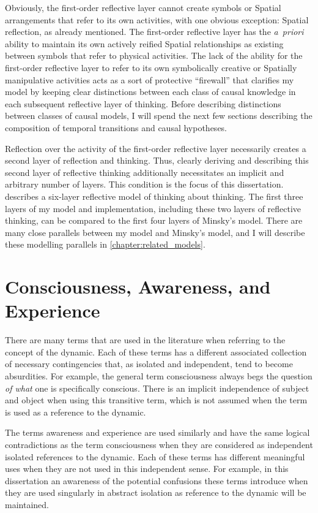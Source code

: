 Obviously, the first-order reflective layer cannot create symbols or
Spatial arrangements that refer to its own activities, with one
obvious exception: Spatial reflection, as already mentioned.  The
first-order reflective layer has the \emph{a~priori} ability to
maintain its own actively reified Spatial relationships as existing
between symbols that refer to physical activities.  The lack of the
ability for the first-order reflective layer to refer to its own
symbolically creative or Spatially manipulative activities acts as a
sort of protective ``firewall'' that clarifies my model by keeping
clear distinctions between each class of causal knowledge in each
subsequent reflective layer of thinking.  Before describing
distinctions between classes of causal models, I will spend the next
few sections describing the composition of temporal transitions and
causal hypotheses.

Reflection over the activity of the first-order reflective layer
necessarily creates a second layer of reflection and thinking.  Thus,
clearly deriving and describing this second layer of reflective
thinking additionally necessitates an implicit and arbitrary number of
layers.  This condition is the focus of this dissertation.
\cite{minsky:2006} describes a six-layer reflective model of thinking
about thinking.  The first three layers of my model and
implementation, including these two layers of reflective thinking, can
be compared to the first four layers of Minsky's model.  There are
many close parallels between my model and Minsky's model, and I will
describe these modelling parallels in
\autoref{chapter:related_models}.

\section{Consciousness, Awareness, and Experience}

There are many terms that are used in the literature when referring to
the concept of the dynamic.  Each of these terms has a different
associated collection of necessary contingencies that, as isolated and
independent, tend to become absurdities.  For example, the general
term consciousness always begs the question \emph{of what} one is
specifically conscious.  There is an implicit independence of subject
and object when using this transitive term, which is not assumed when
the term is used as a reference to the dynamic.

The terms awareness and experience are used similarly and have the
same logical contradictions as the term consciousness when they are
considered as independent isolated references to the dynamic.  Each of
these terms has different meaningful uses when they are not used in
this independent sense.  For example, in this dissertation an
awareness of the potential confusions these terms introduce when they
are used singularly in abstract isolation as reference to the dynamic
will be maintained.

